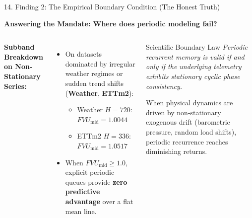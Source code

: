 \documentclass[aspectratio=169, 10pt]{beamer}
\begin{document}
\begin{frame}{14. Finding 2: The Empirical Boundary Condition (The Honest Truth)}
\begin{center}
\textbf{Answering the Mandate: Where does periodic modeling fail?}
\end{center}
\vspace{-0.1cm}
\begin{columns}[T]
\textbf{Subband Breakdown on Non-Stationary Series:}
\begin{itemize}
    \item On datasets dominated by irregular weather regimes or sudden trend shifts (\textbf{Weather}, \textbf{ETTm2}):
    \begin{itemize}
        \item Weather $H=720$: $FVU_{\text{mid}} = \mathbf{1.0044}$
        \item ETTm2 $H=336$: $FVU_{\text{mid}} = \mathbf{1.0517}$
    \end{itemize}
    \item When $FVU_{\text{mid}} \ge 1.0$, explicit periodic queues provide \textbf{zero predictive advantage} over a flat mean line.
\end{itemize}

\begin{block}{Scientific Boundary Law}
\textit{Periodic recurrent memory is valid if and only if the underlying telemetry exhibits stationary cyclic phase consistency.}
\vspace{0.2cm}

When physical dynamics are driven by non-stationary exogenous drift (barometric pressure, random load shifts), periodic recurrence reaches diminishing returns.
\end{block}
\end{columns}
\end{frame}
\end{document}
